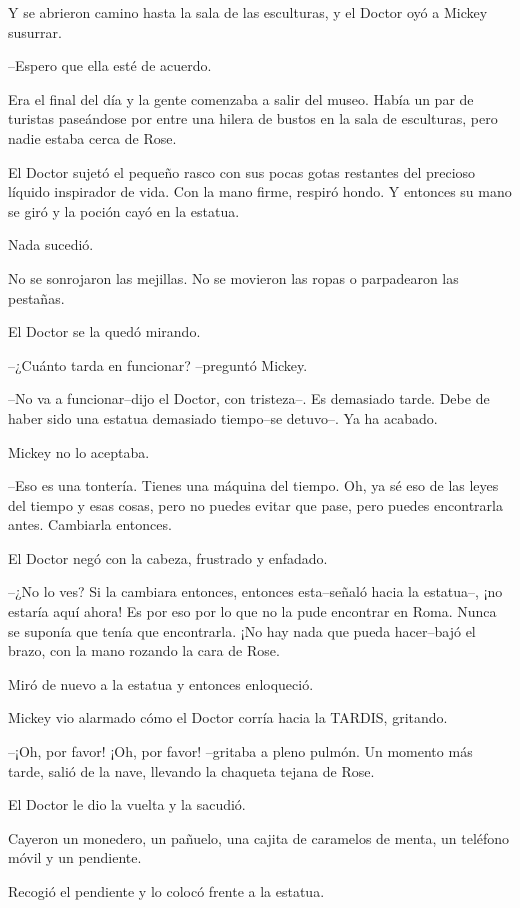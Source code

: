 Y se abrieron camino hasta la sala de las esculturas, y el Doctor oyó a
Mickey susurrar.

--Espero que ella esté de acuerdo.

Era el final del día y la gente comenzaba a salir del museo. Había un
par de turistas paseándose por entre una hilera de bustos en la sala de
esculturas, pero nadie estaba cerca de Rose.

El Doctor sujetó el pequeño rasco con sus pocas gotas restantes del
precioso líquido inspirador de vida. Con la mano firme, respiró hondo. Y
entonces su mano se giró y la poción cayó en la estatua.

Nada sucedió.

No se sonrojaron las mejillas. No se movieron las ropas o parpadearon
las pestañas.

El Doctor se la quedó mirando.

--¿Cuánto tarda en funcionar? --preguntó Mickey.

--No va a funcionar--dijo el Doctor, con tristeza--. Es demasiado tarde.
Debe de haber sido una estatua demasiado tiempo--se detuvo--. Ya ha
acabado.

Mickey no lo aceptaba.

--Eso es una tontería. Tienes una máquina del tiempo. Oh, ya sé eso de
las leyes del tiempo y esas cosas, pero no puedes evitar que pase, pero
puedes encontrarla antes. Cambiarla entonces.

El Doctor negó con la cabeza, frustrado y enfadado.

--¿No lo ves? Si la cambiara entonces, entonces esta--señaló hacia la
estatua--, ¡no estaría aquí ahora! Es por eso por lo que no la pude
encontrar en Roma. Nunca se suponía que tenía que encontrarla. ¡No hay
nada que pueda hacer--bajó el brazo, con la mano rozando la cara de
Rose.

Miró de nuevo a la estatua y entonces enloqueció.

Mickey vio alarmado cómo el Doctor corría hacia la TARDIS, gritando.

--¡Oh, por favor! ¡Oh, por favor! --gritaba a pleno pulmón. Un momento
más tarde, salió de la nave, llevando la chaqueta tejana de Rose.

El Doctor le dio la vuelta y la sacudió.

Cayeron un monedero, un pañuelo, una cajita de caramelos de menta, un
teléfono móvil y un pendiente.

Recogió el pendiente y lo colocó frente a la estatua.

